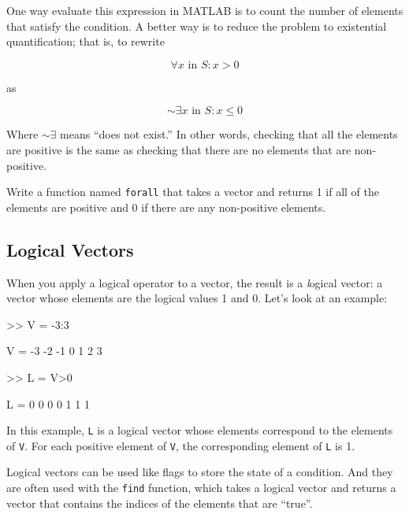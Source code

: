 One way evaluate this expression in MATLAB is to
count the number of elements that satisfy the condition.
A better way is to reduce the problem to
existential quantification; that is, to rewrite

\begin{equation}
\forall x \mbox{~in~} S: x>0
\end{equation}

as

\begin{equation}
\sim \exists x \mbox{~in~} S: x \le 0
\end{equation}

Where $\sim \exists$ means ``does not exist.''
In other words, checking that all the elements are positive is
the same as checking that there are no elements
that are non-positive.

\begin{ex}
Write a function named {\tt forall} that
takes a vector and returns 1 if all of the elements are positive
and 0 if there are any non-positive elements.
\end{ex}




\subsection{Logical Vectors}

When you apply a logical operator to a vector, the result is a 
{\emph logical vector}: a vector whose elements are the logical
values 1 and 0. Let's look at an example:


\begin{code}
>> V = -3:3

V = -3    -2    -1     0     1     2     3

>> L = V>0

L =  0     0     0     0     1     1     1
\end{code}

In this example, {\tt L} is a logical vector whose elements
correspond to the elements of {\tt V}.  For each positive element of
{\tt V}, the corresponding element of {\tt L} is 1.

Logical vectors can be used like flags to store the state of
a condition.  And they are often used with the {\tt find} function,
which takes a logical vector and returns a vector that contains
the indices of the elements that are ``true''.

